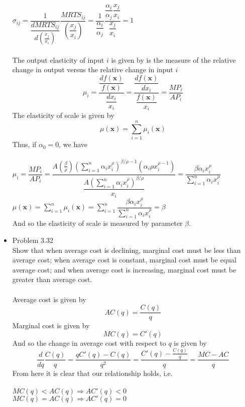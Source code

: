 \documentclass{article}
\begin{document}
\begin{itemize}
    $\sigma_{ij}=\dfrac{1}{\dfrac{dMRTS_{ij}}{d(\frac{x_j}{x_i})}}\dfrac{MRTS_{ij}}{(\dfrac{x_j}{x_i})}=\dfrac{1}{\dfrac{\alpha_i}{\alpha_j}}\dfrac{\dfrac{\alpha_i}{\alpha_j}\dfrac{x_j}{x_i}}{\dfrac{x_j}{x_i}}=1$\\\\
    The output elasticity of input $i$ is given by is the measure of the relative change in output versus the relative change in input $i$\\
    $$\mu_i=\dfrac{\dfrac{df(\textbf{x})}{f(\textbf{x})}}{\dfrac{dx_i}{x_i}}=\dfrac{\dfrac{df(\textbf{x})}{dx_i}}{\dfrac{f(\textbf{x})}{x_i}}=\dfrac{MP_i}{AP_i}$$
    The elasticity of scale is given by\\
    $$\mu(\textbf{x})=\sum_{i=1}^n\mu_i(\textbf{x})$$
    Thus, if $\alpha_0=0$, we have\\\\
    $\mu_i=\dfrac{MP_i}{AP_i}=\dfrac{A(\frac{\beta}{\rho})(\sum_{i=1}^n\alpha_ix_i^\rho)^{\beta/\rho-1}(\alpha_i\rho x_i^{\rho-1})}{\dfrac{A(\sum_{i=1}^n\alpha_ix_i^\rho)^{\beta/\rho}}{x_i}}=\dfrac{\beta\alpha_i x_i^\rho}{\sum_{i=1}^n\alpha_ix_i^\rho}$\\
    $\mu(\textbf{x})=\sum_{i=1}^n\mu_i(\textbf{x})=\sum_{i=1}^n\dfrac{\beta\alpha_i x_i^\rho}{\sum_{i=1}^n\alpha_ix_i^\rho}=\beta$\\
    And so the elasticity of scale is measured by parameter $\beta$.
    \pagebreak
    \item Problem 3.32\\
    Show that when average cost is declining, marginal cost must be less than average cost; when average cost is constant, marginal cost must be equal average cost; and when average cost is increasing, marginal cost must be greater than average cost.\\\\
    Average cost is given by\\
    $$AC(q)=\dfrac{C(q)}{q}$$
    Marginal cost is given by\\
    $$MC(q)=C'(q)$$
    And so the change in average cost with respect to $q$ is given by\\
    $$\dfrac{d}{dq}\dfrac{C(q)}{q}=\dfrac{qC'(q)-C(q)}{q^2}=\dfrac{C'(q)-\frac{C(q)}{q}}{q}=\dfrac{MC-AC}{q}$$
    From here it is clear that our relationship holds, i.e.\\\\
    $MC(q)<AC(q)\Rightarrow AC'(q)<0$\\
    $MC(q)=AC(q)\Rightarrow AC'(q)=0$\\

\end{itemize}
\end{document}
